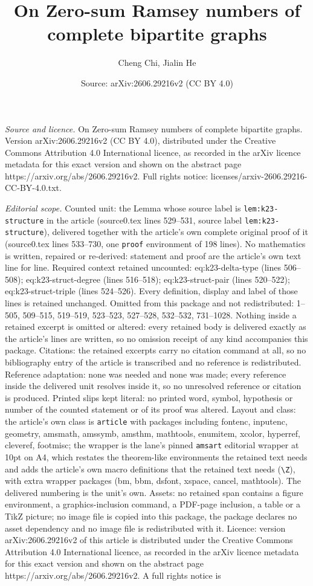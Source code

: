 \documentclass[10pt,a4paper]{amsart}
\title[On Zero-sum Ramsey numbers of complete bipartite graphs]{On Zero-sum Ramsey numbers of complete bipartite graphs}
\author{Cheng Chi, Jialin He}
\date{Source: arXiv:2606.29216v2 (CC BY 4.0)}
\begin{document}
\maketitle

\noindent\emph{Source and licence.} On Zero-sum Ramsey numbers of complete bipartite graphs. Version arXiv:2606.29216v2 (CC BY 4.0), distributed under the Creative Commons Attribution 4.0 International licence, as recorded in the arXiv licence metadata for this exact version and shown on the abstract page https://arxiv.org/abs/2606.29216v2. Full rights notice: licenses/arxiv-2606.29216-CC-BY-4.0.txt.\par\smallskip

\noindent\textit{Editorial scope.} Counted unit: the Lemma whose source label is \texttt{lem:k23-structure} in the article (source0.tex lines 529--531, source label \texttt{lem:k23-structure}), delivered together with the article's own complete original proof of it (source0.tex lines 533--730, one \texttt{proof} environment of 198 lines). No mathematics is written, repaired or re-derived: statement and proof are the article's own text line for line. Required context retained uncounted: eq:k23-delta-type (lines 506--508); eq:k23-struct-degree (lines 516--518); eq:k23-struct-pair (lines 520--522); eq:k23-struct-triple (lines 524--526). Every definition, display and label of those lines is retained unchanged. Omitted from this package and not redistributed: 1--505, 509--515, 519--519, 523--523, 527--528, 532--532, 731--1028. Nothing inside a retained excerpt is omitted or altered: every retained body is delivered exactly as the article's lines are written, so no omission receipt of any kind accompanies this package. Citations: the retained excerpts carry no citation command at all, so no bibliography entry of the article is transcribed and no reference is redistributed. Reference adaptation: none was needed and none was made; every reference inside the delivered unit resolves inside it, so no unresolved reference or citation is produced. Printed slips kept literal: no printed word, symbol, hypothesis or number of the counted statement or of its proof was altered. Layout and class: the article's own class is \texttt{article} with packages including fontenc, inputenc, geometry, amsmath, amssymb, amsthm, mathtools, enumitem, xcolor, hyperref, cleveref, footmisc; the wrapper is the lane's pinned \texttt{amsart} editorial wrapper at 10pt on A4, which restates the theorem-like environments the retained text needs and adds the article's own macro definitions that the retained text needs (\texttt{\textbackslash Z}), with extra wrapper packages (bm, bbm, dsfont, xspace, cancel, mathtools). The delivered numbering is the unit's own. Assets: no retained span contains a figure environment, a graphics-inclusion command, a PDF-page inclusion, a table or a TikZ picture; no image file is copied into this package, the package declares no asset dependency and no image file is redistributed with it. Licence: version arXiv:2606.29216v2 of this article is distributed under the Creative Commons Attribution 4.0 International licence, as recorded in the arXiv licence metadata for this exact version and shown on the abstract page https://arxiv.org/abs/2606.29216v2. A full rights notice is 
\end{document}
